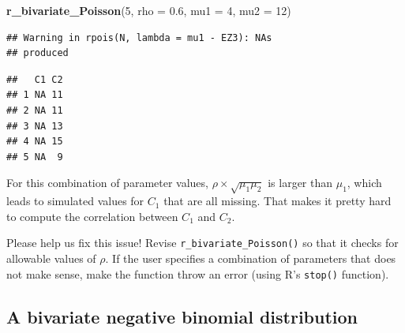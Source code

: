 \documentclass[
]{book}
\newenvironment{Shaded}{\begin{snugshade}}{\end{snugshade}}
\newcommand{\AttributeTok}[1]{\textcolor[rgb]{0.13,0.29,0.53}{#1}}
\newcommand{\DecValTok}[1]{\textcolor[rgb]{0.00,0.00,0.81}{#1}}
\newcommand{\FloatTok}[1]{\textcolor[rgb]{0.00,0.00,0.81}{#1}}
\newcommand{\FunctionTok}[1]{\textcolor[rgb]{0.13,0.29,0.53}{\textbf{#1}}}
\newcommand{\NormalTok}[1]{#1}
\begin{document}
\begin{Shaded}
\begin{Highlighting}[]
\FunctionTok{r\_bivariate\_Poisson}\NormalTok{(}\DecValTok{5}\NormalTok{, }\AttributeTok{rho =} \FloatTok{0.6}\NormalTok{, }\AttributeTok{mu1 =} \DecValTok{4}\NormalTok{, }\AttributeTok{mu2 =} \DecValTok{12}\NormalTok{)}
\end{Highlighting}
\end{Shaded}

\begin{verbatim}
## Warning in rpois(N, lambda = mu1 - EZ3): NAs
## produced
\end{verbatim}

\begin{verbatim}
##   C1 C2
## 1 NA 11
## 2 NA 11
## 3 NA 13
## 4 NA 15
## 5 NA  9
\end{verbatim}

For this combination of parameter values, \(\rho \times \sqrt{\mu_1 \mu_2}\) is larger than \(\mu_1\), which leads to simulated values for \(C_1\) that are all missing.
That makes it pretty hard to compute the correlation between \(C_1\) and \(C_2\).

Please help us fix this issue! Revise \texttt{r\_bivariate\_Poisson()} so that it checks for allowable values of \(\rho\). If the user specifies a combination of parameters that does not make sense, make the function throw an error (using R's \texttt{stop()} function).

\subsection{A bivariate negative binomial distribution}\label{BVNB1}
\end{document}
